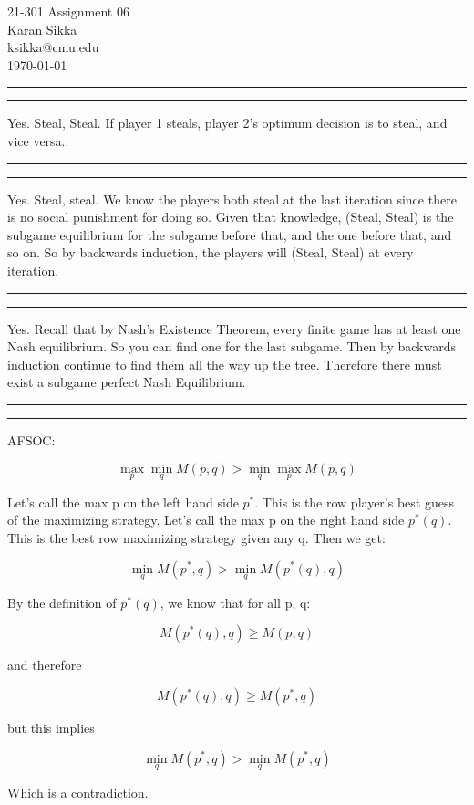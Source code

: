 \documentclass[11pt,letterpaper]{article}
\makeatletter
\newcommand{\question}[1] {\vspace{.25in} \hrule\vspace{0.5em}
\noindent{\bf #1} \vspace{0.5em}
\hrule \vspace{.10in}}
\newcommand{\myname}{Karan Sikka}
\newcommand{\myandrew}{ksikka@cmu.edu}
\newcommand{\myhwnum}{06}
\makeatother
\begin{document}
\medskip

\thispagestyle{plain}
\begin{center}                  %
{\Large 21-301 Assignment \myhwnum} \\
\myname \\
\myandrew \\
\today
\end{center}

\question{1.1}
Yes. Steal, Steal. If player 1 steals, player 2's optimum decision is to steal, and vice versa..

\question{1.2}
Yes. Steal, steal. We know the players both steal at the last iteration since there is no social punishment for doing so.
Given that knowledge, (Steal, Steal) is the subgame equilibrium for the subgame before that, and the one before that, and so on.
So by backwards induction, the players will (Steal, Steal) at every iteration.

\question{1.3}

Yes. Recall that by Nash's Existence Theorem, every finite game has at least one Nash equilibrium.
So you can find one for the last subgame. Then by backwards induction continue to find them all the way up the tree.
Therefore there must exist a subgame perfect Nash Equilibrium.

\question{2}

AFSOC:

$$\max_p \min_q M(p, q) > \min_q \max_p M(p, q)$$

Let's call the max p on the left hand side $p^*$. This is the row player's best guess of the maximizing strategy.
Let's call the max p on the right hand side $p^*(q)$. This is the best row maximizing strategy given any q. Then we get:

$$\min_q M(p^*, q) > \min_q M(p^*(q), q)$$

By the definition of $p^*(q)$, we know that for all p, q:

$$M(p^*(q), q) \geq M(p, q)$$

and therefore

$$M(p^*(q), q) \geq M(p^*, q)$$

but this implies

$$\min_q M(p^*, q) > \min_q M(p^*, q)$$

Which is a contradiction.
\end{document}
